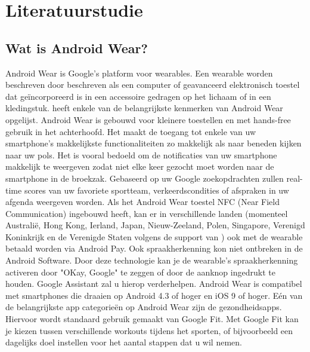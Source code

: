 

\chapter{Literatuurstudie}
\label{ch:literatuurstudie}

\section{Wat is Android Wear?}
\label{sec:androidwear}
Android Wear is Google's platform voor wearables. Een wearable worden beschreven door \textcite{Dictionary} beschreven als een computer of geavanceerd elektronisch toestel dat geïncorporeerd is in een accessoire gedragen op het lichaam of in een kledingstuk. 
\textcite{Techradar} heeft enkele van de belangrijkste kenmerken van Android Wear opgelijst.
Android Wear is gebouwd voor kleinere toestellen en met hands-free gebruik in het achterhoofd. Het maakt de toegang tot enkele van uw smartphone's makkelijkste functionaliteiten zo makkelijk als naar beneden kijken naar uw pols. Het is vooral bedoeld om de notificaties van uw smartphone makkelijk te weergeven zodat niet elke keer gezocht moet worden naar de smartphone in de broekzak. Gebaseerd op uw Google zoekopdrachten zullen real-time scores van uw favoriete sportteam, verkeerdscondities of afspraken in uw afgenda weergeven worden. Als het Android Wear toestel NFC (Near Field Communication) ingebouwd heeft, kan er in verschillende landen (momenteel Australië, Hong Kong, Ierland, Japan, Nieuw-Zeeland, Polen, Singapore, Verenigd Koninkrijk en de Verenigde Staten volgens de support van \cite{Androidpay}) ook met de wearable betaald worden via Android Pay. Ook spraakherkenning kon niet ontbreken in de Android Software. Door deze technologie kan je de wearable's spraakherkenning activeren door "OKay, Google" te zeggen of door de aanknop ingedrukt te houden. Google Assistant zal u hierop verderhelpen. Android Wear is compatibel met smartphones die draaien op Android 4.3 of hoger en iOS 9 of hoger. Eén van de belangrijkste app categorieën op Android Wear zijn de gezondheidsapps. Hiervoor wordt standaard gebruik gemaakt van Google Fit. Met Google Fit kan je kiezen tussen verschillende workouts tijdens het sporten, of bijvoorbeeld een dagelijks doel instellen voor het aantal stappen dat u wil nemen.  
